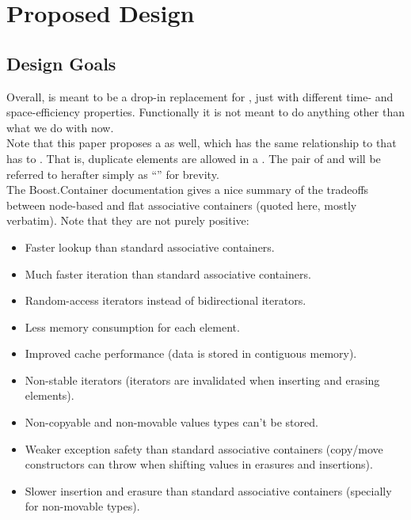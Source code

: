 \section{Proposed Design}

\subsection{Design Goals}

Overall,  is meant to be a drop-in replacement for ,
just with different time- and space-efficiency properties.  Functionally it is
not meant to do anything other than what we do with  now.\\

Note that this paper proposes a  as well, which has the
same relationship to  that  has to .
That is, duplicate elements are allowed in a .  The pair
of  and  will be referred to herafter
simply as ``'' for brevity.\\

The Boost.Container documentation gives a nice summary of the tradeoffs
between node-based and flat associative containers (quoted here, mostly
verbatim).  Note that they are not purely positive:

\begin{itemize}
  \item Faster lookup than standard associative containers.

  \item Much faster iteration than standard associative
    containers.

  \item Random-access iterators instead of bidirectional iterators.

  \item Less memory consumption for each element.

  \item Improved cache performance (data is stored in contiguous memory).

  \item Non-stable iterators (iterators are invalidated when inserting and
    erasing elements).

  \item Non-copyable and non-movable values types can't be stored.

  \item Weaker exception safety than standard associative containers
    (copy/move constructors can throw when shifting values in erasures and
    insertions).

  \item Slower insertion and erasure than standard associative containers
    (specially for non-movable types).
\end{itemize}

